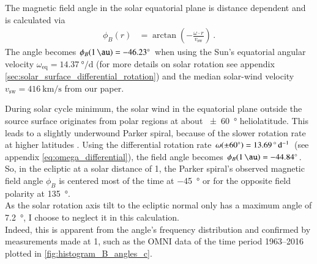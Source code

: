 The magnetic field angle in the solar equatorial plane is distance dependent and is calculated via
\begin{align}
	\phi_B(r) &= \arctan\left(-\frac{\omega \cdot r}{v_\text{sw}}\right)\,.
\end{align}
The angle becomes $\phi_B(\SI{1}{\au}) = \SI{-46.23}{\degree}$ when using the Sun's equatorial angular velocity $\omega_\text{eq} = \SI{14.37}{\degree\per\day}$ (for more details on solar rotation see appendix \autoref{sec:solar_surface_differential_rotation}) and the median solar-wind velocity $v_\text{sw} = \SI{416}{\km\per\s}$ from our paper.

During solar cycle minimum, the solar wind in the equatorial plane outside the source surface originates from polar regions at about \SI{+-60}{\degree} heliolatitude. This leads to a slightly underwound Parker spiral, because of the slower rotation rate at higher latitudes \citep{Banaszkiewicz1998}. Using the differential rotation rate $\omega(\SI{+-60}{\degree}) = \SI{13.69}{\degree\per\day}$ (see appendix \autoref{eq:omega_differential}), the field angle becomes $\phi_B(\SI{1}{\au}) = \SI{-44.84}{\degree}$.\\

So, in the ecliptic at a solar distance of \SI{1}{\au}, the Parker spiral's observed magnetic field angle $\phi_B$ is centered most of the time at \SI{-45}{\degree} or for the opposite field polarity at \SI{135}{\degree}.\\

As the solar rotation axis tilt to the ecliptic normal only has a maximum angle of \SI{7.2}{\degree}, I choose to neglect it in this calculation.\\

Indeed, this is apparent from the angle's frequency distribution and confirmed by measurements made at \SI{1}{\au}, such as the OMNI data of the time period 1963--2016 plotted in \autoref{fig:histogram_B_angles_c}.\\
\begin{figure}[htb]
\end{figure}

